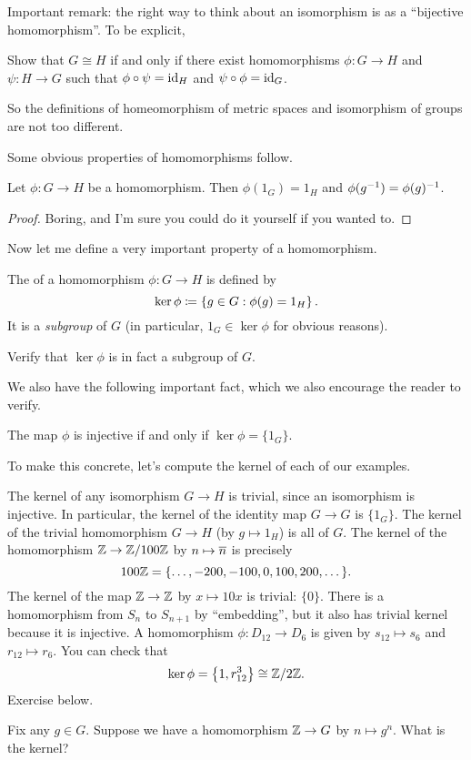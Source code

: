 Important remark:
the right way to think about an isomorphism is as a ``bijective homomorphism''.
To be explicit,
\begin{exercise}
	Show that $G \cong H$ if and only if there exist
	homomorphisms $\phi \colon G \to H$ and $\psi \colon H \to G$
	such that $\phi \circ \psi = \mathrm{id}_H$ and $\psi \circ \phi = \mathrm{id}_G$.
\end{exercise}
So the definitions of homeomorphism of metric spaces
and isomorphism of groups are not too different.

Some obvious properties of homomorphisms follow.
\begin{fact}
	Let $\phi \colon G \to H$ be a homomorphism.
	Then $\phi(1_G) = 1_H$ and $\phi(g^{-1}) = \phi(g)^{-1}$.
\end{fact}
\begin{proof}
	Boring, and I'm sure you could do it yourself if you wanted to.
\end{proof}

Now let me define a very important property of a homomorphism.
\begin{definition}
	The  of a homomorphism $\phi \colon G \to H$ is defined by
	\[ \ker \phi \coloneqq
		\left\{ g \in G : \phi(g) = 1_H \right\}.
		\]
	It is a \emph{subgroup} of $G$
	(in particular, $1_G \in \ker \phi$ for obvious reasons).
\end{definition}
\begin{ques}
	Verify that $\ker\phi$ is in fact a subgroup of $G$.
\end{ques}
We also have the following important fact, which we also encourage the reader to verify.
\begin{proposition}
	The map $\phi$ is injective if and only if $\ker\phi = \{1_G\}$.
\end{proposition}

To make this concrete, let's compute the kernel of each of our examples.
\begin{example}
	\listhack
	\begin{enumerate}[(a)]
		\ii The kernel of any isomorphism $G \to H$ is trivial,
		since an isomorphism is injective.
		In particular, the kernel of the identity map $G \to G$ is $\{1_G\}$.
		\ii The kernel of the trivial homomorphism $G \to H$
		(by $g \mapsto 1_H$) is all of $G$.
		\ii The kernel of the homomorphism $\mathbb Z \to \mathbb Z/100\mathbb Z$ by $n \mapsto \overline n$
		is precisely \[ 100\mathbb Z = \{\dots, -200, -100, 0, 100, 200, \dots \}. \]
		\ii The kernel of the map $\mathbb Z \to \mathbb Z$ by $x \mapsto 10x$ is trivial: $\{0\}$.
		\ii There is a homomorphism from $S_n$ to $S_{n+1}$ by ``embedding'',
		but it also has trivial kernel because it is injective.
		\ii A homomorphism $\phi\colon D_{12} \to D_6$
		is given by $s_{12} \mapsto s_6$ and $r_{12} \mapsto r_6$.
		You can check that
		\[ \ker \phi = \left\{ 1, r_{12}^{3} \right\} \cong \mathbb Z/2\mathbb Z. \]
		\ii Exercise below.
	\end{enumerate}
\end{example}
\begin{exercise}
	Fix any $g \in G$.
	Suppose we have a homomorphism $\mathbb Z \to G$ by $n \mapsto g^n$.
	What is the kernel?
\end{exercise}

